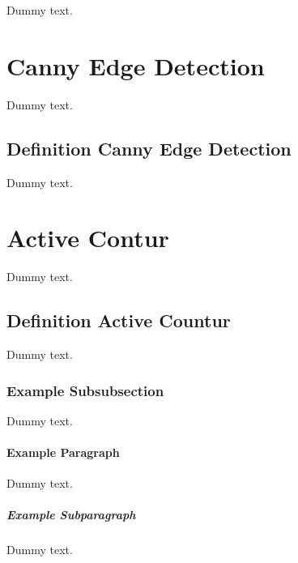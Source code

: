 Dummy text.


\section{Canny Edge Detection}

Dummy text.

\subsection{Definition Canny Edge Detection}

Dummy text.

\section{Active Contur}

Dummy text.

\subsection{Definition Active Countur}

Dummy text.

\subsubsection{Example Subsubsection}

Dummy text.

\paragraph{Example Paragraph}

Dummy text.

\subparagraph{Example Subparagraph}

Dummy text.
